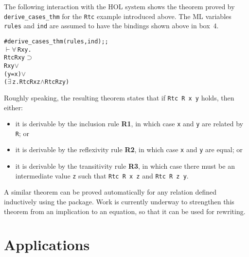 \documentclass[twocolumn,fleqn,layout]{article}
\begin{document}
The following interaction with the {\small HOL} system shows the theorem proved
by \verb!derive_cases_thm! for the \verb!Rtc! example introduced above.  The
{\small ML} variables \verb!rules! and \verb!ind! are assumed to have the
bindings shown above in box~4.

\smallskip

\begin{session}\begin{alltt}
#derive_cases_thm (rules,ind);;
\(\vdash\) \(\forall\,\)R x y.
    Rtc R x y \(\supset\)
      R x y   \(\vee\)
      (y = x) \(\vee\)
      (\(\exists\,\)z. Rtc R x z \(\wedge\) Rtc R z y)
\end{alltt}\end{session}

\smallskip

\noindent Roughly speaking, the resulting theorem states that if
\verb!Rtc R x y! holds, then either:

\begin{itemize}

\item it is derivable by the inclusion rule {{\small\bf R}\bf 1}, in which
case \verb!x! and \verb!y! are related by \verb!R!; or

\item it is derivable by the reflexivity rule {{\small\bf R}\bf 2}, in which
case \verb!x! and \verb!y! are equal; or

\item it is derivable by the transitivity rule {{\small\bf R}\bf 3}, in which
case there must be an intermediate value \verb!z! such that \verb!Rtc R x z!
and \verb!Rtc R z y!.

\end{itemize}

\noindent A similar theorem can be proved automatically for any relation
defined inductively using the package. Work is currently underway to strengthen
this theorem from an implication to an equation, so that it can be used for
rewriting.

\section{Applications}\label{appl}
\end{document}
